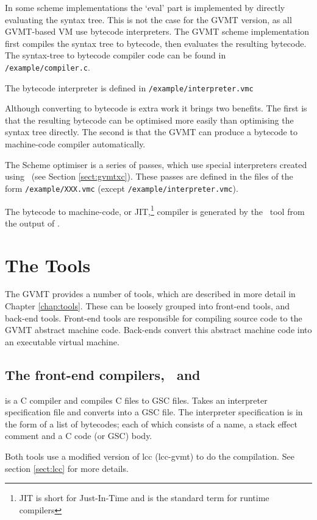 In some scheme implementations the `eval' part is implemented by directly evaluating the syntax tree. This is not the case for the GVMT version, as all GVMT-based VM use bytecode interpreters. The GVMT scheme implementation first compiles the syntax tree to bytecode, then evaluates the resulting bytecode.
The syntax-tree to bytecode compiler code can be found in \verb|/example/compiler.c|.


The bytecode interpreter is defined in \verb|/example/interpreter.vmc|

Although converting to bytecode is extra work it brings two benefits. The first is that the resulting bytecode can be optimised more easily than optimising the syntax tree directly. The second is that the GVMT can produce a bytecode to machine-code compiler automatically.

The Scheme optimiser is a series of passes, which use special interpreters created using \gvmtxc\ (see Section \ref{sect:gvmtxc}).
These passes are defined in the files of the form \verb|/example/XXX.vmc| (except \verb|/example/interpreter.vmc|).

The bytecode to machine-code, or JIT,\footnote{JIT is short for Just-In-Time and is the standard term for runtime compilers} compiler is generated by the \gvmtcc\ tool from the output of \gvmtic.

\section{The Tools}

The GVMT provides a number of tools, which are described in more detail in Chapter \ref{chap:tools}. These can be loosely grouped into front-end tools, and back-end tools. Front-end tools are responsible for compiling source code to the GVMT abstract machine code. Back-ends convert this abstract machine code into an executable virtual machine. 

\subsection{The front-end compilers, \gvmtc\ and \gvmtic}
\gvmtc{} is a C compiler and compiles C files to GSC files.
\gvmtic{} Takes an interpreter specification file and converts into a GSC file.
The interpreter specification is in the form of a list of bytecodes; each of which consists of a name, a stack effect comment and a C code (or GSC) body.

Both tools use a modified version of lcc (lcc-gvmt) to do the compilation. See section \ref{sect:lcc} for more details.

